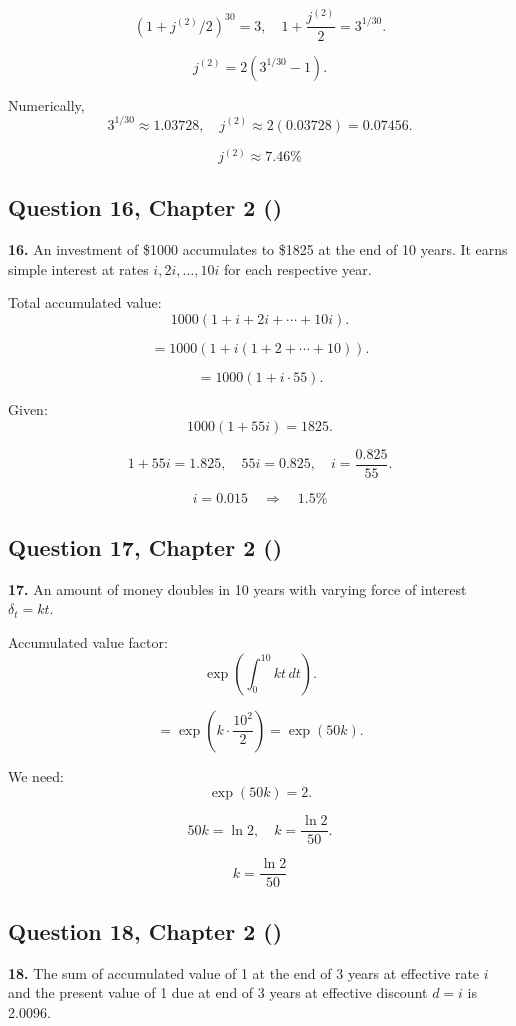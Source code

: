 \documentclass[12pt, a4paper]{article}
\begin{document}
\[
(1+j^{(2)}/2)^{30} = 3,
\quad 1+\frac{j^{(2)}}{2} = 3^{1/30}.
\]

\[
j^{(2)} = 2\left(3^{1/30} - 1\right).
\]

Numerically,
\[
3^{1/30} \approx 1.03728,
\quad j^{(2)} \approx 2(0.03728) = 0.07456.
\]

\[
\boxed{j^{(2)} \approx 7.46\%}
\]

\subsection*{Question 16, Chapter 2 (\cite{toi3rd})}

\textbf{16.} An investment of \$1000 accumulates to \$1825 at the end of 10 years.  
It earns simple interest at rates \(i, 2i, \dots, 10i\) for each respective year.  

\bigskip
Total accumulated value:
\[
1000\left(1 + i + 2i + \cdots + 10i\right).
\]

\[
= 1000\left(1 + i(1+2+\cdots+10)\right).
\]

\[
= 1000\left(1 + i\cdot 55\right).
\]

Given:
\[
1000(1+55i) = 1825.
\]

\[
1+55i = 1.825, \quad 55i = 0.825, \quad i = \frac{0.825}{55}.
\]

\[
i = 0.015 \quad \Rightarrow \quad \boxed{1.5\%}
\]

\subsection*{Question 17, Chapter 2 (\cite{toi3rd})}

\textbf{17.} An amount of money doubles in 10 years with varying force of interest 
\(\delta_t = kt\).  

\bigskip
Accumulated value factor:
\[
\exp\!\left(\int_0^{10} kt \, dt \right).
\]

\[
= \exp\!\left( k \cdot \frac{10^2}{2} \right) = \exp(50k).
\]

We need:
\[
\exp(50k) = 2.
\]

\[
50k = \ln 2, \quad k = \frac{\ln 2}{50}.
\]

\[
\boxed{k = \frac{\ln 2}{50}}
\]

\subsection*{Question 18, Chapter 2 (\cite{toi3rd})}

\textbf{18.} The sum of accumulated value of 1 at the end of 3 years at effective rate \(i\) 
and the present value of 1 due at end of 3 years at effective discount \(d=i\) is 2.0096.  
\end{document}
